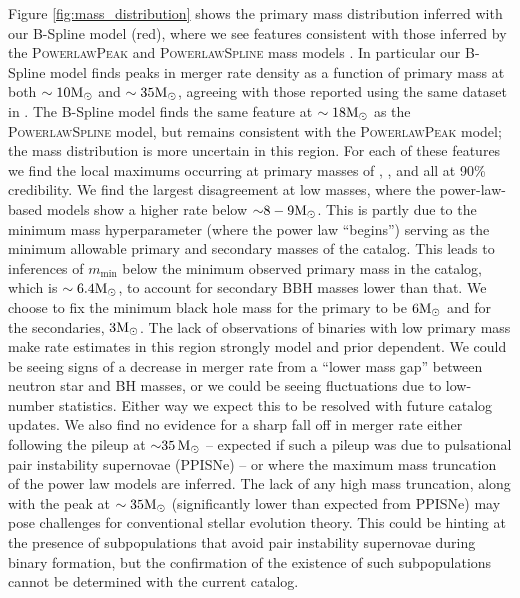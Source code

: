 Figure \ref{fig:mass_distribution} shows the primary mass distribution inferred with our B-Spline model (red), where we see features consistent with those inferred by the \textsc{PowerlawPeak} and \textsc{PowerlawSpline} mass models \citep{Talbot_2018,o3a_pop,Edelman_2022ApJ,o3b_astro_dist,gwtc3_POPDATA}. 
In particular our B-Spline model finds peaks in merger rate density as a function of primary mass at both $\sim10{\rm M}_\odot$ and $\sim35{\rm M}_\odot$, agreeing with those 
reported using the same dataset in \citet{o3b_astro_dist}. The B-Spline model finds the same feature at $\sim18{\rm M}_\odot$ as the \textsc{PowerlawSpline} model, but remains consistent with the \textsc{PowerlawPeak} model; the mass distribution is more uncertain in this region. For each of these features we find the local maximums occurring at primary masses of \result{$\CIPlusMinus{\macros[MassDistribution][BSpline][peaks][10]}\,\msun$},  
\result{$\CIPlusMinus{\macros[MassDistribution][BSpline][peaks][18]}\,\msun$}, and  
\result{$\CIPlusMinus{\macros[MassDistribution][BSpline][peaks][35]}\,\msun$} all at 90\% credibility.
We find the largest disagreement at low masses, where the power-law-based models show a higher rate below ${\sim}8-9{\rm M}_\odot$. This is partly due to the minimum mass hyperparameter (where the power law ``begins'') serving as the minimum allowable primary and secondary masses of the catalog. This leads to inferences of $m_\mathrm{min}$ below the minimum observed primary mass in the catalog, which is $\sim 6.4{\rm M}_\odot$, to account for secondary BBH masses lower than that. We choose to fix the minimum black hole mass for the primary to be $6{\rm M}_\odot$ and for the secondaries, $3{\rm M}_\odot$. The lack of observations of binaries with low primary mass make rate estimates in this region strongly model and prior dependent. We could be seeing signs of a decrease in merger rate from a ``lower mass gap'' between neutron star and BH masses, or we could be seeing fluctuations due to low-number statistics.  Either way we expect this to be resolved with future catalog updates. We also find no evidence for a sharp fall off in merger rate either following 
the pileup at ${\sim}35\,{\rm M}_\odot$ -- expected if such a pileup was due to pulsational pair instability supernovae (PPISNe) -- or where the maximum mass truncation of the power law models 
are inferred. The lack of any high mass truncation, along with the peak at $\sim35{\rm M}_\odot$ (significantly lower than expected from PPISNe) may pose challenges for conventional stellar 
evolution theory. This could be hinting at the presence of subpopulations that avoid pair instability supernovae during binary formation, but the confirmation of the existence of such subpopulations 
cannot be determined with the current catalog. 

